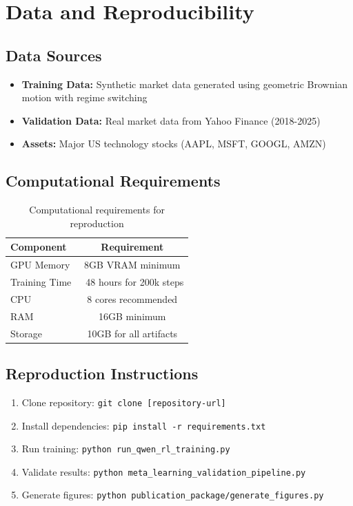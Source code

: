 \documentclass[10pt]{IEEEtran}
\begin{document}
\section{Data and Reproducibility}

\subsection{Data Sources}
\begin{itemize}
\item \textbf{Training Data:} Synthetic market data generated using geometric Brownian motion with regime switching
\item \textbf{Validation Data:} Real market data from Yahoo Finance (2018-2025)
\item \textbf{Assets:} Major US technology stocks (AAPL, MSFT, GOOGL, AMZN)
\end{itemize}

\subsection{Computational Requirements}
\begin{table}[h]
\centering
\begin{tabular}{lc}
\toprule
\textbf{Component} & \textbf{Requirement} \\
\midrule
GPU Memory & 8GB VRAM minimum \\
Training Time & ~48 hours for 200k steps \\
CPU & 8 cores recommended \\
RAM & 16GB minimum \\
Storage & 10GB for all artifacts \\
\bottomrule
\end{tabular}
\caption{Computational requirements for reproduction}
\end{table}

\subsection{Reproduction Instructions}
\begin{enumerate}
\item Clone repository: \texttt{git clone [repository-url]}
\item Install dependencies: \texttt{pip install -r requirements.txt}
\item Run training: \texttt{python run\_qwen\_rl\_training.py}
\item Validate results: \texttt{python meta\_learning\_validation\_pipeline.py}
\item Generate figures: \texttt{python publication\_package/generate\_figures.py}
\end{enumerate}
\end{document}

